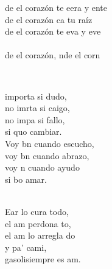\documentclass[12pt]{article}
\begin{document}
\begin{multicols*}{2}
\begin{cancion}
\begin{chorus}
	de el corazón te eera y ente  \\
	de el corazón ca tu raíz  \\
	de el corazón te eva y eve  \\
{}\vspace*{-0.4cm}\\
	de el corazón, nde el corn  \\
	\end{chorus}%
	\jump\\
\end{cancion}%

\begin{cancion}%
	 importa si dudo,  \\
	no imrta si caigo,  \\
	no impa si fallo, \\
	si quo cambiar. \\
	Voy bn cuando escucho, \\
	voy bn cuando abrazo, \\
	voy n cuando ayudo \\
	si bo amar. \\\jump\\
	\begin{chorus}%
	Ear lo cura todo, \\
	el am perdona to, \\
	el am lo arregla do \\
	y pa' cami, \\
	gasolisiempre es am.\\
	\end{chorus}%
	\jump\\
\end{cancion}%


\end{multicols*}
\end{document}
